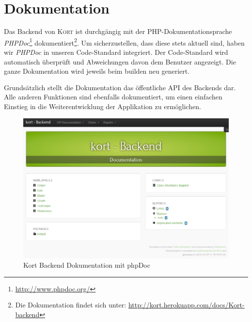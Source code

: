 \section{Dokumentation}
\label{backend-dokumentation}

Das Backend von \textsc{Kort} ist durchgängig mit der PHP-Dokumentationsprache \emph{PHPDoc}\footnote{\url{http://www.phpdoc.org/}} dokumentiert\footnote{Die Dokumentation findet sich unter: \url{http://kort.herokuapp.com/docs/Kort-backend}}.
Um sicherzustellen, dass diese stets aktuell sind, haben wir \emph{PHPDoc} in unseren Code-Standard integriert.
Der Code-Standard wird automatisch überprüft und Abweichungen davon dem Benutzer angezeigt.
Die ganze Dokumentation wird jeweils beim builden neu generiert.

Grundsätzlich stellt die Dokumentation das öffentliche \gls{API} des Backends dar.
Alle anderen Funktionen sind ebenfalls dokumentiert, um einen einfachen Einstieg in die Weiterentwicklung der Applikation zu ermöglichen.

\begin{figure}[H]
	\centering
	\includegraphics[width=\textwidth]{images/implementation/backend/kort-backend-documentation}
	\caption{Kort Backend Dokumentation mit phpDoc}
	\label{image-kort-backend-documentation}
\end{figure}